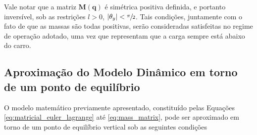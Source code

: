 \documentclass{ppgeesa}
\begin{document}
Vale notar que a matriz $\mathbf{M}(\mathbf{q})$ é simétrica positiva definida, e portanto inversível, sob as restrições $l>0$, $|\theta_y| < \sfrac{\pi}{2}$. Tais condições, juntamente com o fato de que as massas são todas positivas, serão consideradas satisfeitas no regime de operação adotado, uma vez que representam que a carga sempre está abaixo do carro.

\subsection{Aproximação do Modelo Dinâmico em torno de um ponto de equilíbrio}

O modelo matemático previamente apresentado, constituído pelas Equações \ref{eq:matricial_euler_lagrange} até \ref{eq:mass_matrix}, pode ser aproximado em torno de um ponto de equilíbrio vertical sob as seguintes condições\cite{lee}
\end{document}
